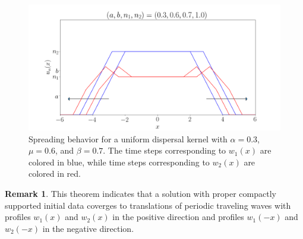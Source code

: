 \documentclass[11pt]{article}
\theoremstyle{definition}
\newtheorem{rem}[thm]{Remark}
\numberwithin{equation}{section}
\numberwithin{thm}{section}
\begin{document}
%
%

\begin{figure}[h!] 
\centering
  \caption{Spreading behavior for a uniform dispersal kernel with $\alpha=0.3$, $\mu=0.6$, and $\beta=0.7$. The time steps corresponding to $w_1(x)$ are colored in blue, while time steps corresponding to $w_2(x)$ are colored in red.}
\label{fig5}
  \includegraphics[width=.8\linewidth]{figures/fig5.png}
\end{figure}

\begin{rem}
This theorem indicates that a solution with proper compactly supported initial data coverges to translations of periodic traveling waves with profiles $w_1(x)$ and $w_2(x)$ in the positive direction and profiles $w_1(-x)$ and $w_2(-x)$ in the negative direction.
\end{rem}
\end{document}
